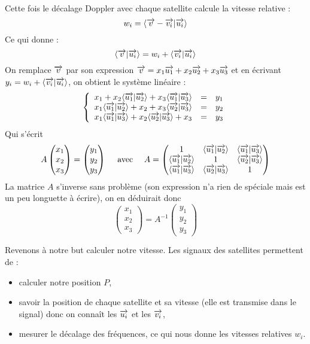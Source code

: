 \documentclass[class=report,crop=false]{standalone}
\begin{document}
Cette fois le décalage Doppler avec chaque satellite calcule la vitesse relative :
$$w_i = \langle \overrightarrow{v}-\overrightarrow{v_i} | \overrightarrow{u_i} \rangle$$
Ce qui donne :
$$
\langle \overrightarrow{v} | \overrightarrow{u_i} \rangle
= w_i + \langle \overrightarrow{v_i} | \overrightarrow{u_i} \rangle$$
On remplace $\overrightarrow v$ par son expression 
$\overrightarrow v = x_1 \overrightarrow{u_1}+x_2 \overrightarrow{u_2}+x_3 \overrightarrow{u_3}$ et en 
écrivant $y_i = w_i + \langle \overrightarrow{v_i} | \overrightarrow{u_i} \rangle$, on obtient le système linéaire :
$$\left\{
\begin{array}{rcl}
x_1+ x_2 \langle \overrightarrow{u_1} | \overrightarrow{u_2}\rangle + x_3 \langle\overrightarrow{u_1} | \overrightarrow{u_3} \rangle & = & y_1\\
x_1\langle \overrightarrow{u_1} | \overrightarrow{u_2}\rangle+ x_2  + x_3 \langle\overrightarrow{u_2} | \overrightarrow{u_3} \rangle & = & y_2\\ 
x_1\langle\overrightarrow{u_1} | \overrightarrow{u_3} \rangle+ x_2 \langle \overrightarrow{u_2} | \overrightarrow{u_3}\rangle + x_3  & = & y_3\\ 
\end{array}
\right.$$
Qui s'écrit 
$$A \begin{pmatrix}x_1\\x_2\\x_3\end{pmatrix} = \begin{pmatrix}y_1\\y_2\\y_3\end{pmatrix}
\quad \text{ avec } \quad
A = 
\begin{pmatrix}
  1 & \langle \overrightarrow{u_1} | \overrightarrow{u_2} \rangle & \langle\overrightarrow{u_1} | \overrightarrow{u_3}\rangle\\ 
\langle \overrightarrow{u_1} | \overrightarrow{u_2} \rangle & 1 & \langle \overrightarrow{u_2} | \overrightarrow{u_3}\rangle \\
  \langle\overrightarrow{u_1} | \overrightarrow{u_3}\rangle & \langle \overrightarrow{u_2} | \overrightarrow{u_3}\rangle & 1 \\
\end{pmatrix}$$
La matrice $A$ s'inverse sans problème 
(son expression n'a rien de spéciale mais est un peu longuette à écrire),
on en déduirait donc
$$\begin{pmatrix}x_1\\x_2\\x_3\end{pmatrix} 
= A^{-1} \begin{pmatrix}y_1\\y_2\\y_3\end{pmatrix}$$


Revenons à notre but calculer notre vitesse. Les signaux des satellites permettent de :
\begin{itemize}
  \item calculer notre position $P$,
  \item savoir la position de chaque satellite et sa vitesse (elle est transmise dans le signal) 
  donc on connaît les $\overrightarrow{u_i}$ et les $\overrightarrow{v_i}$,
  \item mesurer le décalage des fréquences, ce qui  nous donne les vitesses relatives $w_i$.
\end{itemize}
\end{document}
